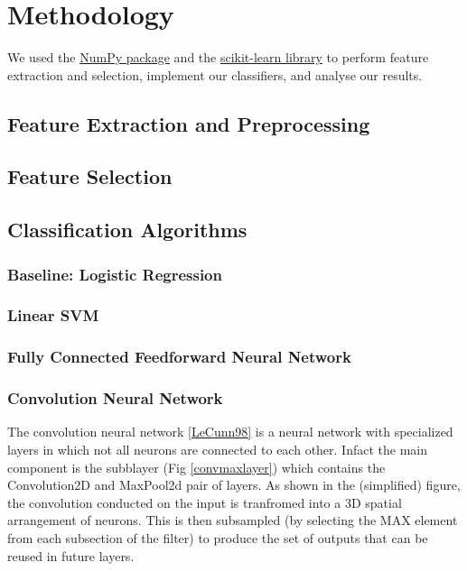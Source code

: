 \documentclass[conference]{IEEEtran}
\begin{document}
\section{Methodology}

We used the \href{http://www.numpy.org/}{NumPy package} and the \href{http://www.scikit-learn.org/}{scikit-learn library} to perform feature extraction and selection, implement our classifiers, and analyse our results. 

\subsection{Feature Extraction and Preprocessing}


\subsection{Feature Selection}

\subsection{Classification Algorithms}

\subsubsection{Baseline: Logistic Regression}

\subsubsection{Linear SVM}

\subsubsection{Fully Connected Feedforward Neural Network}

\subsubsection{Convolution Neural Network}
The convolution neural network \ref{LeCunn98} is a neural network with specialized layers in which not all neurons are connected to each other. Infact the main component is the subblayer (Fig \ref{convmaxlayer}) which contains the Convolution2D and MaxPool2d pair of layers. As shown in the (simplified) figure, the convolution conducted on the input is tranfromed into a 3D spatial arrangement of neurons. This is then subsampled (by selecting the MAX element from each subsection of the filter) to produce the set of outputs that can be reused in future layers.
\end{document}
